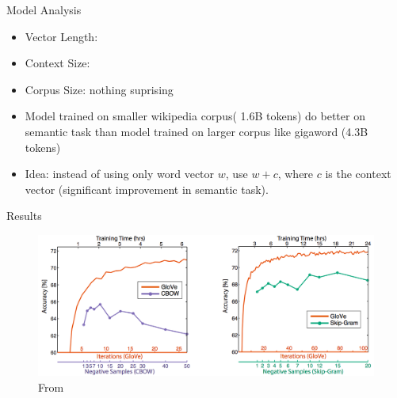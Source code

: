 \begin{frame}{Model Analysis}
  \begin{itemize}
  \item Vector Length:
  \item Context Size: 
  \item Corpus Size: nothing suprising
  \item Model trained on smaller wikipedia corpus( 1.6B tokens) do better on semantic task than model trained on larger corpus like gigaword (4.3B tokens)
  \item Idea: instead of using only word vector $w$, use $w+c$, where $c$ is the context vector (significant improvement in semantic task).
  \end{itemize}
\end{frame}

\begin{frame}{Results}
    \begin{figure}
      \includegraphics[scale=0.27]{images/gloveVSword2vec.png}
      \caption{From}
    \end{figure}
\end{frame}

